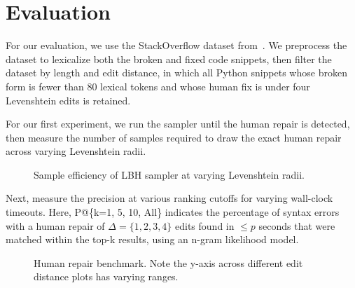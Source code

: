\section{Evaluation}
For our evaluation, we use the StackOverflow dataset from~\cite{hindle2012naturalness}. We preprocess the dataset to lexicalize both the broken and fixed code snippets, then filter the dataset by length and edit distance, in which all Python snippets whose broken form is fewer than 80 lexical tokens and whose human fix is under four Levenshtein edits is retained.

For our first experiment, we run the sampler until the human repair is detected, then measure the number of samples required to draw the exact human repair across varying Levenshtein radii.

\begin{figure}[h!]
  
  \caption{Sample efficiency of LBH sampler at varying Levenshtein radii.}\label{fig:sample_efficiency}
\end{figure}

Next, measure the precision at various ranking cutoffs for varying wall-clock timeouts. Here, P@\{k=1, 5, 10, All\} indicates the percentage of syntax errors with a human repair of $\Delta=\{1, 2, 3, 4\}$ edits found in $\leq p$ seconds that were matched within the top-k results, using an n-gram likelihood model.

\begin{figure}[h!]
  \resizebox{.24\textwidth}{!}{}
  \resizebox{.24\textwidth}{!}{}
  \resizebox{.24\textwidth}{!}{}
  \resizebox{.24\textwidth}{!}{}
  \caption{Human repair benchmark. Note the y-axis across different edit distance plots has varying ranges.}\label{fig:human}
\end{figure}